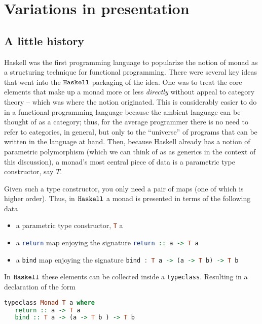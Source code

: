 \section{Variations in presentation}

\subsection{A little history}
Haskell was the first programming language to popularize the notion of
monad as a structuring technique for functional programming. There
were several key ideas that went into the $\texttt{Haskell}$ packaging of the
idea. One was to treat the core elements that make up a monad more or
less \emph{directly} without appeal to category theory -- which was
where the notion originated. This is considerably easier to do in a
functional programming language because the ambient language can be
thought of as a category; thus, for the average programmer there is no
need to refer to categories, in general, but only to the ``universe''
of programs that can be written in the language at hand. Then, because
Haskell already has a notion of parametric polymorphism (which we can
think of as as generics in the context of this discussion), a monad's
most central piece of data is a parametric type constructor, say $T$.

Given such a type constructor, you only need a pair of maps (one of
which is higher order). Thus, in $\texttt{Haskell}$ a monad is presented in
terms of the following data

\begin{itemize}
  \item a parametric type constructor, \lstinline[language=Haskell]!T! a
  \item a \lstinline[language=Haskell]!return! map enjoying the
    signature \lstinline[language=Haskell]!return :: a -> T a!
  \item a \lstinline[language=Haskell]!bind! map enjoying the
    signature \lstinline[language=Haskell]!bind : T a -> (a -> T b) -> T b!
\end{itemize}

In $\texttt{Haskell}$ these elements can be collected inside a
\lstinline[language=Haskell]!typeclass!. Resulting in a declaration of
the form

\begin{lstlisting}[captionpos=b,language=Haskell,caption=monad typeclass]
  typeclass Monad T a where
   return :: a -> T a
   bind :: T a -> (a -> T b ) -> T b
\end{lstlisting}

